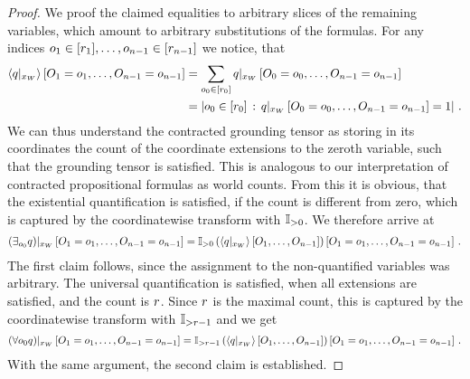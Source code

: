 \begin{proof}
    We proof the claimed equalities to arbitrary slices of the remaining variables, which amount to arbitrary substitutions of the formulas.
    For any indices $o_{1}\in[r_{1}],\ldots,o_{n-1}\in[r_{n-1}]$ we notice, that
    \begin{align*}
        \left\langle {q}|_{x_{W}}\right\rangle \left[ O_{1}=o_{1},\ldots,O_{n-1}=o_{n-1} \right]
        &= \sum_{o_{0}\in[r_{0}]} {q}|_{x_{W}} \left[O_{0}=o_{0},\ldots,O_{n-1}=o_{n-1}\right] \\
        &= \left|o_{0}\in[r_{0}] \, : \, {q}|_{x_{W}} \left[O_{0}=o_{0},\ldots,O_{n-1}=o_{n-1}\right]=1\right| \, .
    \end{align*}
    We can thus understand the contracted grounding tensor as storing in its coordinates the count of the coordinate extensions to the zeroth variable, such that the grounding tensor is satisfied.
    This is analogous to our interpretation of contracted propositional formulas as world counts.
    From this it is obvious, that the existential quantification is satisfied, if the count is different from zero, which is captured by the coordinatewise transform with $\mathbb{I}_{>0}$.
    We therefore arrive at
    \begin{align*}
        {\left(\exists_{o_{0}}q\right)}|_{x_{W}} \left[O_{1}=o_{1},\ldots,O_{n-1}=o_{n-1}\right] =
        {\mathbb{I}_{>0}}\left(\left\langle {q}|_{x_{W}}\right\rangle \left[ O_{1},\ldots,O_{n-1} \right]\right)\left[O_{1}=o_{1},\ldots,O_{n-1}=o_{n-1}\right] \, .
    \end{align*}
    The first claim follows, since the assignment to the non-quantified variables was arbitrary.
    The universal quantification is satisfied, when all extensions are satisfied, and the count is $r$.
    Since $r$ is the maximal count, this is captured by the coordinatewise transform with $\mathbb{I}_{>r-1}$ and we get
    \begin{align*}
        {\left(\forall{o_{0}}q\right)}|_{x_{W}} \left[O_{1}=o_{1},\ldots,O_{n-1}=o_{n-1}\right] =
        {\mathbb{I}_{>r-1}}\left(\left\langle {q}|_{x_{W}}\right\rangle \left[ O_{1},\ldots,O_{n-1} \right]\right)\left[O_{1}=o_{1},\ldots,O_{n-1}=o_{n-1}\right] \, .
    \end{align*}
    With the same argument, the second claim is established.
\end{proof}

